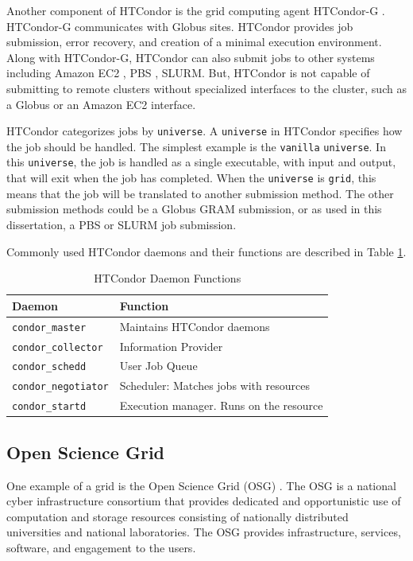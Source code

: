 Another component of HTCondor is the grid computing agent HTCondor-G \cite{frey2002condor}.  HTCondor-G communicates with Globus \cite{foster1997globus} sites.  HTCondor provides job submission, error recovery, and creation of a minimal execution environment.  Along with HTCondor-G, HTCondor can also submit jobs to other systems including Amazon EC2 \cite{amazonec2}, PBS \cite{pbstorque}, SLURM.  But, HTCondor is not capable of submitting to remote clusters without specialized interfaces to the cluster, such as a Globus or an Amazon EC2 interface.

HTCondor categorizes jobs by \texttt{universe}.  A \texttt{universe} in HTCondor specifies how the job should be handled.  The simplest example is the \texttt{vanilla} \texttt{universe}.  In this \texttt{universe}, the job is handled as a single executable, with input and output, that will exit when the job has completed.  When the \texttt{universe} is \texttt{grid}, this means that the job will be translated to another submission method.  The other submission methods could be a Globus GRAM submission, or as used in this dissertation, a PBS or SLURM \cite{yoo2003slurm} job submission.

Commonly used HTCondor daemons and their functions are described in Table \ref{table:condordaemons}.

\begin{table}
	\centering
	\begin{tabular}{| l | l |}
		\hline
		Daemon & Function \\
		\hline \hline
		\texttt{condor\_master} & Maintains HTCondor daemons   \\ \hline
		\texttt{condor\_collector} & Information Provider \\ \hline
		\texttt{condor\_schedd} & User Job Queue \\ \hline
		\texttt{condor\_negotiator} & Scheduler: Matches jobs with resources \\ \hline
		\texttt{condor\_startd} & Execution manager.  Runs on the resource \\ \hline
	\end{tabular}
	\caption{HTCondor Daemon Functions} \label{table:condordaemons}
\end{table}

\subsection{Open Science Grid}
One example of a grid is the Open Science Grid (OSG) \cite{pordes2007open}. The OSG is a national cyber infrastructure consortium that provides dedicated and opportunistic use of computation and storage resources consisting of nationally distributed universities and national laboratories. The OSG provides infrastructure, services, software, and engagement to the users.  

